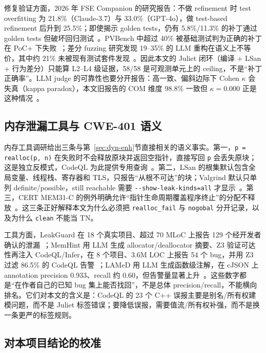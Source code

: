 \documentclass[conference]{IEEEtran}
\begin{document}
修复验证方面，2026 年 FSE Companion 的研究报告：不做 refinement 时 test overfitting 为 21.8\%（Claude-3.7）与 33.0\%（GPT-4o），做 test-based refinement 后升到 25.5\%；即使揭示 golden tests，仍有 5.8\%/11.3\% 的补丁通过 golden tests 但破坏回归测试~\cite{ahmed2026overfitting}。PVBench 中超过 40\% 被基础测试判为正确的补丁在 PoC+ 下失败~\cite{yu2026pvbench}；差分 fuzzing 研究发现 19--35\% 的 LLM 重构在语义上不等价，其中约 21\% 未被现有测试套件发现~\cite{dristi2026differential}。因此本文的 Juliet 闭环（编译 + LSan + 行为差分）只能算 L2--L4 级证据，58/58 是可观测单元上的 ceiling，不是“补丁正确率”。LLM judge 的可靠性也要分开报告：高一致、偏斜边际下 Cohen $\kappa$ 会失真（kappa paradox），本文旧报告的 COM 维度 98.8\% 一致但 $\kappa=0.000$ 正是这种情况~\cite{feinstein1990kappa,gwet2008}。

\subsection{内存泄漏工具与 CWE-401 语义}

内存工具调研给出三条与第~\ref{sec:dyn-enh}节直接相关的语义事实。第一，\texttt{p = realloc(p, n)} 在失败时不会释放原块并返回空指针，直接写回 \texttt{p} 会丢失原块；这是独立反模式，CodeQL 为此提供专用查询~\cite{cppreference_realloc,codeqldocs}。第二，LSan 的根集默认包含全局变量、线程栈、寄存器和 TLS，只报告“从根不可达”的块；Valgrind 默认只单列 definite/possible，still reachable 需要 \texttt{-{}-show-leak-kinds=all} 才显示~\cite{valgrindmanual,lsan}。第三，CERT MEM31-C 的例外明确允许“指针生命周期覆盖程序终止”的分配不释放~\cite{certmem31,mitrecwe401}。这三条正好解释本文为什么必须把 \texttt{realloc\_fail} 与 \texttt{nogobal} 分开记录，以及为什么 \texttt{clean} 不能当 TN。

工具方面，LeakGuard 在 18 个真实项目、超过 70 MLoC 上报告 129 个经开发者确认的泄漏~\cite{liang2025leakguard}；MemHint 用 LLM 生成 allocator/deallocator 摘要、Z3 验证可达性再注入 CodeQL/Infer，在 8 个项目、3.6M LOC 上报告 54 个 bug，并用 Z3 过滤 86.5\% 的 CodeQL 告警~\cite{huang2026memhint}；LAMeD 用 LLM 生成函数级注解，在 cJSON 上 annotation precision 0.933、recall 约 0.60，但告警量显著上升~\cite{shemetova2025lamed}。这些数字都是“在作者自己的已知 bug 集上能否找回”，不是总体 precision/recall，不能横向排名。它们对本文的含义是：CodeQL 的 23 个 C++ 误报主要是别名/所有权建模问题，而不是 Juliet 标签错误；要降低误报，需要值流/所有权补强，而不是换一条更严的标签规则。

\subsection{对本项目结论的校准}
\end{document}
